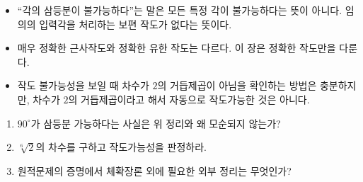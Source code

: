 \begin{pitfall}
\begin{itemize}
  \item ``각의 삼등분이 불가능하다''는 말은 모든 특정 각이 불가능하다는 뜻이 아니다. 임의의 입력각을 처리하는 보편 작도가 없다는 뜻이다.
  \item 매우 정확한 근사작도와 정확한 유한 작도는 다르다. 이 장은 정확한 작도만을 다룬다.
  \item 작도 불가능성을 보일 때 차수가 $2$의 거듭제곱이 아님을 확인하는 방법은 충분하지만, 차수가 $2$의 거듭제곱이라고 해서 자동으로 작도가능한 것은 아니다.
\end{itemize}
\end{pitfall}

\begin{checkpoint}
\begin{enumerate}[label=(\alph*)]
  \item $90^\circ$가 삼등분 가능하다는 사실은 위 정리와 왜 모순되지 않는가?
  \item $\sqrt[6]2$의 차수를 구하고 작도가능성을 판정하라.
  \item 원적문제의 증명에서 체확장론 외에 필요한 외부 정리는 무엇인가?
\end{enumerate}
\end{checkpoint}

